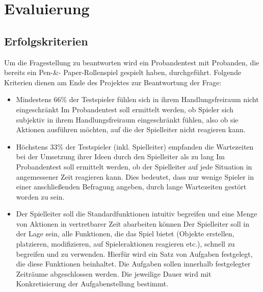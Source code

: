 \chapter{Evaluierung}
\label{evaluation}


\section{Erfolgskriterien}
\label{sec:Erfolgskriterien}
Um die Fragestellung zu beantworten wird ein Probandentest mit Probanden, die bereits ein Pen-\&-
Paper-Rollenspiel gespielt haben, durchgeführt. Folgende Kriterien dienen am Ende des Projektes zur
Beantwortung der Frage:

\begin{itemize}
	\item Mindestens 66\% der Testspieler fühlen sich in ihrem Handlungsfreiraum nicht eingeschränkt
Im Probandentest soll ermittelt werden, ob Spieler sich subjektiv in ihrem Handlungsfreiraum
eingeschränkt fühlen, also ob sie Aktionen ausführen möchten, auf die der Spielleiter nicht
reagieren kann.
	\item Höchstens 33\% der Testspieler (inkl. Spielleiter) empfanden die Wartezeiten bei der
Umsetzung ihrer Ideen durch den Spielleiter als zu lang
Im Probandentest soll ermittelt werden, ob der Spielleiter auf jede Situation in
angemessener Zeit reagieren kann. Dies bedeutet, dass nur wenige Spieler in einer
anschließenden Befragung angeben, durch lange Wartezeiten gestört worden zu sein.
	\item Der Spielleiter soll die Standardfunktionen intuitiv begreifen und eine Menge von Aktionen in
vertretbarer Zeit abarbeiten können
Der Spielleiter soll in der Lage sein, alle Funktionen, die das Spiel bietet (Objekte erstellen,
platzieren, modifizieren, auf Spieleraktionen reagieren etc.), schnell zu begreifen und zu
verwenden. Hierfür wird ein Satz von Aufgaben festgelegt, die diese Funktionen beinhaltet.
Die Aufgaben sollen innerhalb festgelegter Zeiträume abgeschlossen werden. Die jeweilige
Dauer wird mit Konkretisierung der Aufgabenstellung bestimmt.
\end{itemize}
  



